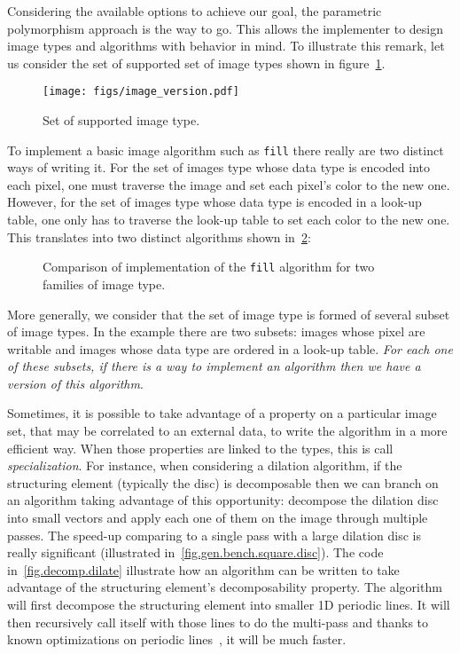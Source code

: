 Considering the available options to achieve our goal, the parametric polymorphism approach is the way to go. This
allows the implementer to design image types and algorithms with behavior in mind. To illustrate this remark, let us
consider the set of supported set of image types shown in figure~\ref{fig.image.version}.

\begin{figure}[tbh]
  \centering
  \texttt{[image: figs/image\_version.pdf]}
  \caption{Set of supported image type.}
  \label{fig.image.version}
\end{figure}

To implement a basic image algorithm such as \texttt{fill} there really are two distinct ways of writing it. For the
set of images type whose data type is encoded into each pixel, one must traverse the image and set each pixel's color
to the new one. However, for the set of images type whose data type is encoded in a look-up table, one only has to
traverse the look-up table to set each color to the new one. This translates into two distinct algorithms shown
in~\cref{traverse.vs.LUT}:

\begin{figure}[tbh]
  \centering
  \scriptsize
  \hfil

  \caption{Comparison of implementation of the \texttt{fill} algorithm for two
    families of image type.}
  \label{traverse.vs.LUT}
\end{figure}

More generally, we consider that the set of image type is formed of several subset of image types. In the example there
are two subsets: images whose pixel are writable and images whose data type are ordered in a look-up table. \emph{For
  each one of these subsets, if there is a way to implement an algorithm then we have a \emph{version} of this algorithm}.

Sometimes, it is possible to take advantage of a property on a particular image set, that may be correlated to an
external data, to write the algorithm in a more efficient way. When those properties are linked to the types, this is
call \emph{specialization}. For instance, when considering a dilation algorithm, if the structuring element (typically
the disc) is decomposable then we can branch on an algorithm taking advantage of this opportunity: decompose the
dilation disc into small vectors and apply each one of them on the image through multiple passes. The speed-up comparing
to a single pass with a large dilation disc is really significant (illustrated in~\ref{fig.gen.bench.square.disc}). The
code in~\ref{fig.decomp.dilate} illustrate how an algorithm can be written to take advantage of the structuring
element's decomposability property. The algorithm will first decompose the structuring element into smaller 1D periodic
lines. It will then recursively call itself with those lines to do the multi-pass and thanks to known optimizations on
periodic lines~\cite{vanherk.1992.localminmax}, it will be much faster.


